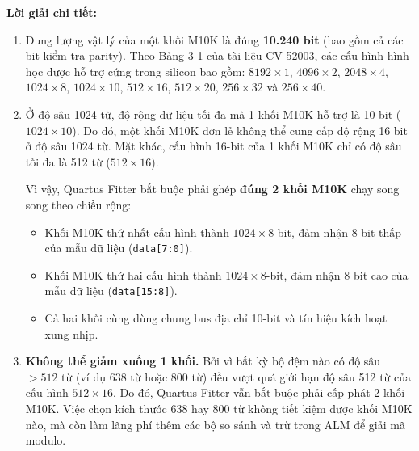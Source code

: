 \textbf{Lời giải chi tiết:}
\begin{enumerate}[label=(\alph*)]
    \item Dung lượng vật lý của một khối M10K là đúng \textbf{10.240 bit} (bao gồm cả các bit kiểm tra parity).
    Theo Bảng 3-1 của tài liệu CV-52003, các cấu hình hình học được hỗ trợ cứng trong silicon bao gồm:
    $8192 \times 1$, $4096 \times 2$, $2048 \times 4$, $1024 \times 8$, $1024 \times 10$, $512 \times 16$, $512 \times 20$, $256 \times 32$ và $256 \times 40$.
    
    \item Ở độ sâu 1024 từ, độ rộng dữ liệu tối đa mà 1 khối M10K hỗ trợ là 10 bit ($1024 \times 10$). Do đó, một khối M10K đơn lẻ không thể cung cấp độ rộng 16 bit ở độ sâu 1024 từ. Mặt khác, cấu hình 16-bit của 1 khối M10K chỉ có độ sâu tối đa là 512 từ ($512 \times 16$).
    
    Vì vậy, Quartus Fitter bắt buộc phải ghép \textbf{đúng 2 khối M10K} chạy song song theo chiều rộng:
    \begin{itemize}[leftmargin=1.5em, itemsep=1pt]
        \item Khối M10K thứ nhất cấu hình thành $1024 \times 8$-bit, đảm nhận 8 bit thấp của mẫu dữ liệu (\texttt{data[7:0]}).
        \item Khối M10K thứ hai cấu hình thành $1024 \times 8$-bit, đảm nhận 8 bit cao của mẫu dữ liệu (\texttt{data[15:8]}).
        \item Cả hai khối cùng dùng chung bus địa chỉ 10-bit và tín hiệu kích hoạt xung nhịp.
    \end{itemize}
    
    \item \textbf{Không thể giảm xuống 1 khối.} Bởi vì bất kỳ bộ đệm nào có độ sâu $> 512$ từ (ví dụ 638 từ hoặc 800 từ) đều vượt quá giới hạn độ sâu 512 từ của cấu hình $512 \times 16$. Do đó, Quartus Fitter vẫn bắt buộc phải cấp phát 2 khối M10K. Việc chọn kích thước 638 hay 800 từ không tiết kiệm được khối M10K nào, mà còn làm lãng phí thêm các bộ so sánh và trừ trong ALM để giải mã modulo.
\end{enumerate}

